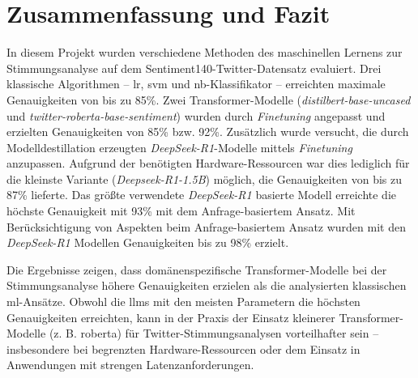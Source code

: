 \section{Zusammenfassung und Fazit}\label{sec:zusammenfassung-und-fazit}

In diesem Projekt wurden verschiedene Methoden des maschinellen Lernens zur Stimmungsanalyse auf dem Sentiment140-Twitter-Datensatz evaluiert.
Drei klassische Algorithmen – \gls{lr}, \gls{svm} und \gls{nb}-Klassifikator – erreichten maximale Genauigkeiten von bis zu 85\%.
Zwei Transformer-Modelle (\emph{distilbert-base-uncased} und \emph{twitter-roberta-base-sentiment}) wurden durch \textit{Finetuning} angepasst und erzielten Genauigkeiten von 85\% bzw. 92\%.
Zusätzlich wurde versucht, die durch Modelldestillation erzeugten \emph{DeepSeek-R1}-Modelle mittels \textit{Finetuning} anzupassen.
Aufgrund der benötigten Hardware-Res\-sour\-cen war dies lediglich für die kleinste Variante (\emph{Deepseek-R1-1.5B}) möglich, die Genauigkeiten von bis zu 87\% lieferte.
Das größte verwendete \emph{DeepSeek-R1} basierte Modell erreichte die höchste Genauigkeit mit 93\% mit dem Anfrage-basiertem Ansatz.
Mit Berücksichtigung von Aspekten beim Anfrage-basiertem Ansatz wurden mit den \emph{DeepSeek-R1} Modellen Genauigkeiten bis zu 98\% erzielt.

Die Ergebnisse zeigen, dass domänenspezifische Transformer-Modelle bei der Stimmungsanalyse höhere Genauigkeiten erzielen als die analysierten klassischen \gls{ml}-Ansätze.
Obwohl die \glspl{llm} mit den meisten Parametern die höchsten Genauigkeiten erreichten, kann in der Praxis der Einsatz kleinerer Transformer-Modelle (z. B. \gls{roberta}) für Twitter-Stimmungsanalysen vorteilhafter sein – insbesondere bei begrenzten Hardware-Ressourcen oder dem Einsatz in Anwendungen mit strengen Latenzanforderungen.
